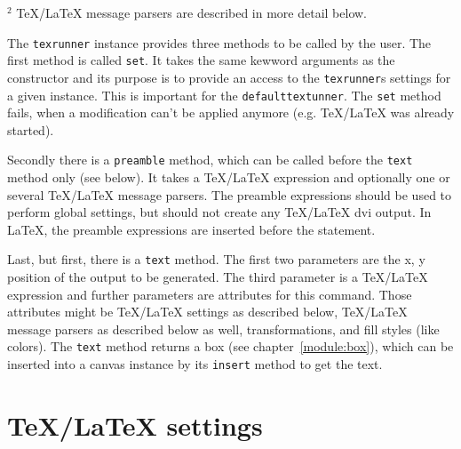 $^2$
\TeX/\LaTeX{} message parsers are described in more detail below.

\medskip
The \verb|texrunner| instance provides three methods to be called by
the user. The first method is called \verb|set|. It takes the same
kewword arguments as the constructor and its purpose is to provide an
access to the \verb|texrunner|s settings for a given instance. This is
important for the \verb|defaulttextunner|. The \verb|set| method
fails, when a modification can't be applied anymore (e.g.
\TeX/\LaTeX{} was already started).

Secondly there is a \verb|preamble| method, which can be called before
the \verb|text| method only (see below). It takes a \TeX/\LaTeX{}
expression and optionally one or several \TeX/\LaTeX{} message
parsers. The preamble expressions should be used to perform global
settings, but should not create any \TeX/\LaTeX{} dvi output. In
\LaTeX, the preamble expressions are inserted before the
\verb|| statement.

Last, but first, there is a \verb|text| method. The first two
parameters are the x, y position of the output to be generated. The
third parameter is a \TeX/\LaTeX{} expression and further parameters
are attributes for this command. Those attributes might be
\TeX/\LaTeX{} settings as described below, \TeX/\LaTeX{} message
parsers as described below as well, \PyX{} transformations, and \PyX{}
fill styles (like colors). The \verb|text| method returns a box (see
chapter~\ref{module:box}), which can be inserted into a canvas
instance by its \verb|insert| method to get the text.

\section{\TeX/\LaTeX{} settings}

